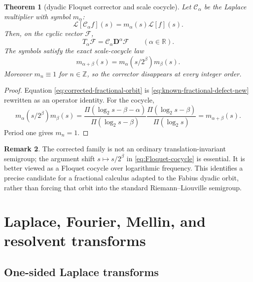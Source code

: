 \documentclass[11pt,oneside]{article}
\newtheorem{theorem}{Theorem}[section]
\theoremstyle{definition}
\newtheorem{remark}[theorem]{Remark}
\newcommand{\R}{\mathbb R}
\newcommand{\Z}{\mathbb Z}
\begin{document}
\begin{theorem}[dyadic Floquet corrector and scale cocycle]
\label{thm:Floquet-corrector}
Let \(\mathcal C_\alpha\) be the Laplace multiplier with symbol \(m_\alpha\):
\begin{equation}\label{eq:Calpha-def}
 \mathcal L[\mathcal C_\alpha f](s)=m_\alpha(s)\mathcal L[f](s).
\end{equation}
Then, on the cyclic vector \(\mathcal F\),
\begin{equation}\label{eq:corrected-fractional-orbit}
 \boxed{
 T_\alpha\mathcal F
 =\mathcal C_\alpha\mathbf D^\alpha\mathcal F
 \qquad(\alpha\in\R).}
\end{equation}
The symbols satisfy the exact scale-cocycle law
\begin{equation}\label{eq:Floquet-cocycle}
 m_{\alpha+\beta}(s)
 =m_\alpha(s/2^\beta)m_\beta(s).
\end{equation}
Moreover \(m_n\equiv1\) for \(n\in\Z\), so the corrector disappears at every integer
order.
\end{theorem}

\begin{proof}
Equation \eqref{eq:corrected-fractional-orbit} is
\eqref{eq:known-fractional-defect-new} rewritten as an operator identity.  For the
cocycle,
\[
 m_\alpha(s/2^\beta)m_\beta(s)
 =\frac{\Pi(\log_2s-\beta-\alpha)}{\Pi(\log_2s-\beta)}
  \frac{\Pi(\log_2s-\beta)}{\Pi(\log_2s)}
 =m_{\alpha+\beta}(s).
\]
Period one gives \(m_n=1\).
\end{proof}

\begin{remark}
The corrected family is not an ordinary translation-invariant semigroup; the argument
shift \(s\mapsto s/2^\beta\) in \eqref{eq:Floquet-cocycle} is essential.  It is better
viewed as a Floquet cocycle over logarithmic frequency.  This identifies a precise
candidate for a fractional calculus adapted to the Fabius dyadic orbit, rather than
forcing that orbit into the standard Riemann--Liouville semigroup.
\end{remark}


\section{Laplace, Fourier, Mellin, and resolvent transforms}

\subsection{One-sided Laplace transforms}
\end{document}
